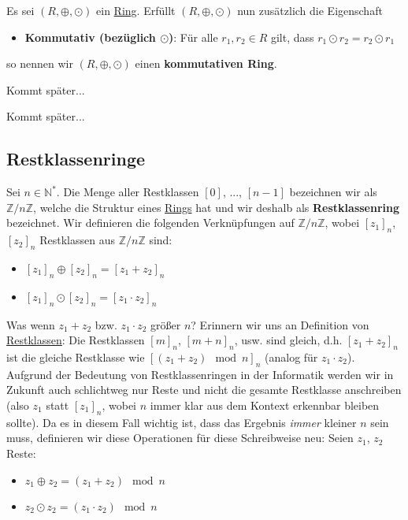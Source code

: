 \documentclass[../../main.tex]{subfiles}
\begin{document}
		\begin{definition}
			\label{def:kommutativerRing}
			Es sei $(R, \oplus, \odot)$ ein \hyperref[def:Ring]{Ring}. Erfüllt $(R, \oplus, \odot)$ nun zusätzlich die Eigenschaft 
			\begin{itemize}
				\item \textbf{Kommutativ (bezüglich $\odot$)}: Für alle $r_1,r_2 \in R$ gilt, dass $r_1 \odot r_2 = r_2 \odot r_1$
			\end{itemize}
			so nennen wir $(R, \oplus, \odot)$ einen \textbf{kommutativen Ring}.
		\end{definition}
		
		
		\begin{definition}
			Kommt später...
		\end{definition}
	
		\begin{definition}[Unterring]
			Kommt später...
		\end{definition}
	
		\subsection{Restklassenringe}
		\begin{definition}[Restklassenring]
			\label{def:Restklassenring}
			Sei $n \in \mathbb{N}^*$. Die Menge aller Restklassen $[0]$, ..., $[n-1]$ bezeichnen wir als $\mathbb{Z}/n\mathbb{Z}$, welche die Struktur eines \hyperref[def:Ring]{Rings} hat und wir deshalb als \textbf{Restklassenring} bezeichnet. Wir definieren die folgenden Verknüpfungen auf $\mathbb{Z}/n\mathbb{Z}$, wobei $[z_1]_n$, $[z_2]_n$ Restklassen aus $\mathbb{Z}/n\mathbb{Z}$ sind: 
			\begin{itemize}
				\item $[z_1]_n \oplus [z_2]_n = [z_1 + z_2]_n$
				\item $[z_1]_n \odot [z_2]_n = [z_1 \cdot z_2]_n$
			\end{itemize}
			Was wenn $z_1+z_2$ bzw. $z_1 \cdot z_2$ größer $n$? Erinnern wir uns an Definition von \hyperref[def:Restklasse]{Restklassen}: Die Restklassen $[m]_n$, $[m+n]_n$, usw. sind gleich, d.h. $[z_1 + z_2]_n$ ist die gleiche Restklasse wie $[(z_1 + z_2) \mod n]_n$ (analog für $z_1 \cdot z_2$). \\
			
			Aufgrund der Bedeutung von Restklassenringen in der Informatik werden wir in Zukunft auch schlichtweg nur Reste und nicht die gesamte Restklasse anschreiben (also $z_1$ statt $[z_1]_n$, wobei $n$ immer klar aus dem Kontext erkennbar bleiben sollte). Da es in diesem Fall wichtig ist, dass das Ergebnis \textit{immer} kleiner $n$ sein muss, definieren wir diese Operationen für diese Schreibweise neu: Seien $z_1$, $z_2$ Reste:
			\begin{itemize}
				\item $z_1 \oplus z_2 = (z_1 + z_2) \mod n$
				\item $z_2 \odot z_2 = (z_1 \cdot z_2) \mod n$
			\end{itemize}
		\end{definition}
	
\end{document}
